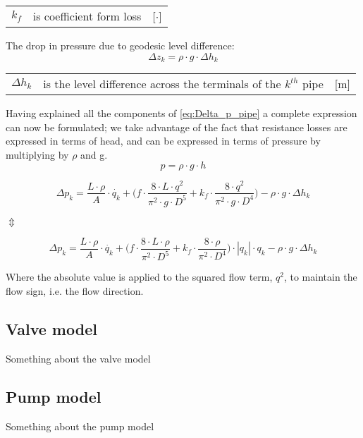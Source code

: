\begin{center}
	\begin{tabular}{l p{8cm} l}
		$k_{f}$ &  is coefficient form loss & [$\cdot$]\\
	\end{tabular}
\end{center}

The drop in pressure due to geodesic level difference:
\begin{equation}
	\Delta{z_{k}} = \rho \cdot g \cdot \Delta{h_{k}}
\end{equation}

\begin{center}
	\begin{tabular}{l p{8cm} l}
		$\Delta{h_{k}}$ &  is the level difference across the terminals of the $k^{th}$ pipe & [\si{m}]\\
	\end{tabular}
\end{center}

Having explained all the components of \eqref{eq:Delta_p_pipe} a complete expression can now be formulated; we take advantage of the fact that resistance losses are expressed in terms of head, and can be expressed in terms of pressure by multiplying by $\rho$ and g. \begin{equation}
	p = \rho \cdot g \cdot h  
\end{equation}

\begin{equation}
	\Delta{p_{k}} = \frac{L\cdot \rho}{A}\cdot \dot{q_{k}}+\Big(f \cdot \frac{8\cdot L\cdot q^{2}}{\pi^{2}\cdot g \cdot D^{5}} + k_{f}\cdot \frac{8\cdot q^{2}}{\pi^{2}\cdot g \cdot D^{4}}\Big) - \rho \cdot g \cdot \Delta{h_{k}}
\end{equation}
\begin{center}$\Updownarrow$\end{center}
\begin{equation}
	\Delta{p_{k}} = \frac{L\cdot \rho}{A}\cdot \dot{q_{k}}
	+\Big(f \cdot \frac{8\cdot L\cdot \rho}{\pi^{2} \cdot D^{5}} + k_{f}\cdot \frac{8\cdot \rho}{\pi^{2} \cdot D^{4}}\Big)\cdot |q_{k}|\cdot q_{k} 
	- \rho \cdot g \cdot \Delta{h_{k}}
\end{equation}

Where the absolute value is applied to the squared ﬂow term, $q^{2}$, to maintain the ﬂow sign, i.e. the ﬂow direction.

\subsection{Valve model}
Something about the valve model

\subsection{Pump model}
Something about the pump model
